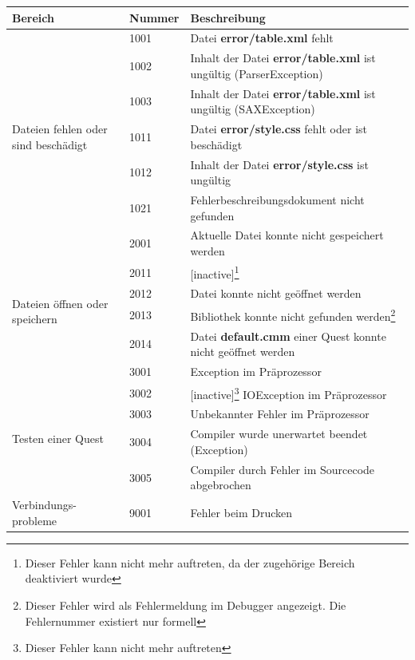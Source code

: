 \def\arraystretch{1.6}
\begin{minipage}{14cm}
\begin{tabular}{l|l|l}
	Bereich&Nummer&Beschreibung\\
	\hline
	&1001&Datei \textbf{error/table.xml} fehlt\\
	\multirow{5}{15mm}{\begin{sideways}\parbox{35mm}{Dateien fehlen oder sind beschädigt}\end{sideways}}&1002&Inhalt der Datei \textbf{error/table.xml} ist ungültig (ParserException)\\
	&1003&Inhalt der Datei \textbf{error/table.xml} ist ungültig (SAXException)\\
	&1011&Datei \textbf{error/style.css} fehlt oder ist beschädigt\\
	&1012&Inhalt der Datei \textbf{error/style.css} ist ungültig\\
	&1021&Fehlerbeschreibungsdokument nicht gefunden\\
	\hline
	&2001&Aktuelle Datei konnte nicht gespeichert werden\\
	\multirow{4}{15mm}{\begin{sideways}\parbox{25mm}{Dateien öffnen oder speichern}\end{sideways}}&2011&[inactive]\footnote{Dieser Fehler kann nicht mehr auftreten, da der zugehörige Bereich deaktiviert wurde}\\
	&2012&Datei konnte nicht geöffnet werden\\
	&2013&Bibliothek konnte nicht gefunden werden\footnote{Dieser Fehler wird als Fehlermeldung im Debugger angezeigt. Die Fehlernummer existiert nur formell}\\
	&2014&Datei \textbf{default.cmm} einer Quest konnte nicht geöffnet werden\\
	\hline
	&3001&Exception im Präprozessor\\
	\multirow{4}{15mm}{\begin{sideways}\parbox{25mm}{Testen einer Quest}\end{sideways}}&3002&[inactive]\footnote{Dieser Fehler kann nicht mehr auftreten} IOException im Präprozessor\\
	&3003&Unbekannter Fehler im Präprozessor\\
	&3004&Compiler wurde unerwartet beendet (Exception)\\
	&3005&Compiler durch Fehler im Sourcecode abgebrochen\\
	\hline
	\parbox{23mm}{Verbindungs- probleme}&9001&Fehler beim Drucken
\end{tabular}
\end{minipage}